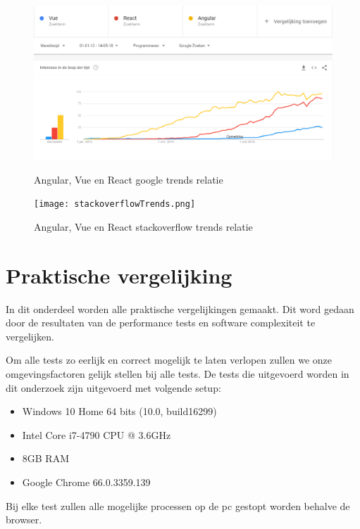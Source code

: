 \begin{figure}[h!]
	\caption{Angular, Vue en React google trends relatie \autocite{_google_2012}}
	\centering
	\includegraphics[width=1\textwidth]{img/googleTrends.png}
	\label{fig:google_trends}
\end{figure}

\begin{figure}[h!]
	\caption{Angular, Vue en React stackoverflow trends relatie \autocite{_stackoverflow_2009}}
	\centering
	\texttt{[image: stackoverflowTrends.png]}
	\label{fig:stackoverflow_trends}
\end{figure}


\section{Praktische vergelijking}
\label{sec:praktische_vergelijking}
In dit onderdeel worden alle praktische vergelijkingen gemaakt. Dit word gedaan door de resultaten van de performance tests en software complexiteit te vergelijken.

Om alle tests zo eerlijk en correct mogelijk te laten verlopen zullen we onze omgevingsfactoren gelijk stellen bij alle tests. De tests die uitgevoerd worden in dit onderzoek zijn uitgevoerd met volgende setup:

\begin{itemize}
	\item Windows 10 Home 64 bits (10.0, build16299)
	\item Intel Core i7-4790 CPU @ 3.6GHz
	\item 8GB RAM
	\item Google Chrome 66.0.3359.139
\end{itemize}

Bij elke test zullen alle mogelijke processen op de pc gestopt worden behalve de browser.

